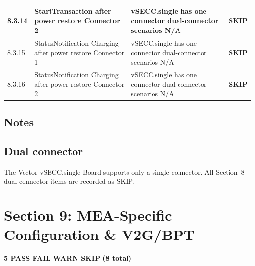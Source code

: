 \documentclass[10pt, a4paper]{article}
\begin{document}
\begin{longtable}{|L{1cm}|L{5.5cm}|M{7cm}|C{1.8cm}|}
\hline
\small 8.3.14 & \small StartTransaction after power restore  Connector 2 & vSECC.single has one connector  dual-connector scenarios N/A & \textcolor{skipgray}{\textbf{SKIP}} \\
\hline
\small 8.3.15 & \small StatusNotification Charging after power restore  Connector 1 & vSECC.single has one connector  dual-connector scenarios N/A & \textcolor{skipgray}{\textbf{SKIP}} \\
\hline
\small 8.3.16 & \small StatusNotification Charging after power restore  Connector 2 & vSECC.single has one connector  dual-connector scenarios N/A & \textcolor{skipgray}{\textbf{SKIP}} \\
\hline
\end{longtable}
\normalsize
\subsection*{Notes}

\subsection*{Dual connector}
The Vector vSECC.single Board supports only a single connector.
All Section~8 dual-connector items are recorded as SKIP.



\newpage
\section{Section 9: MEA-Specific Configuration \& V2G/BPT}
\textbf{5 PASS  FAIL  WARN  SKIP \quad (8 total)}
\end{document}
